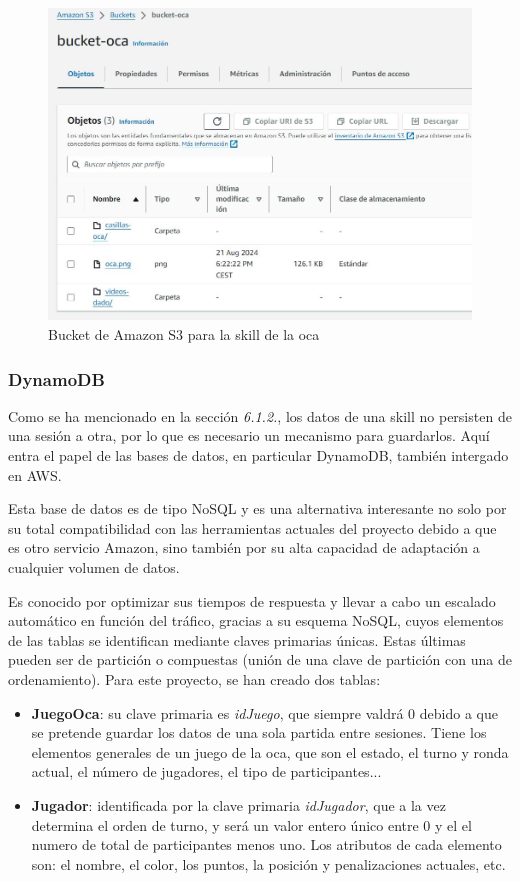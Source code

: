 \begin{figure}[H]
	\centering
	\includegraphics[width=1\textwidth]{imgs/aws-s3-1.jpg}
	\caption{Bucket de Amazon S3 para la skill de la oca}
	\label{fig:aws-s3-1}
\end{figure}

\subsubsection{DynamoDB}

Como se ha mencionado en la sección \textit{6.1.2.}, los datos de una skill no persisten de una sesión a otra, por lo que es necesario un mecanismo para guardarlos. Aquí entra el papel de las bases de datos, en particular DynamoDB, también intergado en AWS.

Esta base de datos es de tipo NoSQL y es una alternativa interesante no solo por su total compatibilidad con las herramientas actuales del proyecto debido a que es otro servicio Amazon, sino también por su alta capacidad de adaptación a cualquier volumen de datos. 

Es conocido por optimizar sus tiempos de respuesta y llevar a cabo un escalado automático en función del tráfico, gracias a su esquema NoSQL, cuyos elementos de las tablas se identifican mediante claves primarias únicas. Estas últimas pueden ser de partición o compuestas (unión de una clave de partición con una de ordenamiento). Para este proyecto, se han creado dos tablas: 
\begin{itemize}
	\item \textbf{JuegoOca}: su clave primaria es \textit{idJuego}, que siempre valdrá 0 debido a que se pretende guardar los datos de una sola partida entre sesiones. Tiene los elementos generales de un juego de la oca, que son el estado, el turno y ronda actual, el número de jugadores, el tipo de participantes...
	\item \textbf{Jugador}: identificada por la clave primaria \textit{idJugador}, que a la vez determina el orden de turno, y será un valor entero único entre 0 y el el numero de total de participantes menos uno. Los atributos de cada elemento son: el nombre, el color, los puntos, la posición y penalizaciones actuales, etc.
\end{itemize} 

